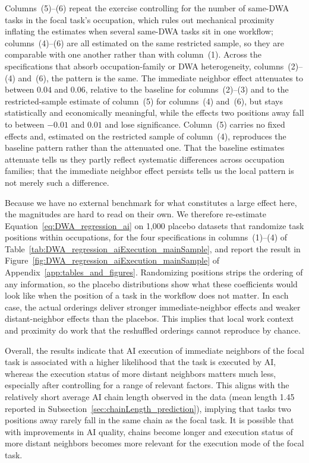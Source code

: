 Columns~(5)--(6) repeat the exercise controlling for the number of same-DWA tasks in the focal task's occupation, which rules out mechanical proximity inflating the estimates when several same-DWA tasks sit in one workflow; columns~(4)--(6) are all estimated on the same restricted sample, so they are comparable with one another rather than with column~(1).
Across the specifications that absorb occupation-family or DWA heterogeneity, columns~(2)--(4) and~(6), the pattern is the same.
The immediate neighbor effect attenuates to between $0.04$ and $0.06$, relative to the baseline for columns~(2)--(3) and to the restricted-sample estimate of column~(5) for columns~(4) and~(6), but stays statistically and economically meaningful, while the effects two positions away fall to between $-0.01$ and $0.01$ and lose significance.
Column~(5) carries no fixed effects and, estimated on the restricted sample of column~(4), reproduces the baseline pattern rather than the attenuated one.
That the baseline estimates attenuate tells us they partly reflect systematic differences across occupation families; that the immediate neighbor effect persists tells us the local pattern is not merely such a difference.

Because we have no external benchmark for what constitutes a large effect here, the magnitudes are hard to read on their own.
We therefore re-estimate Equation~\eqref{eq:DWA_regression_ai} on 1,000 placebo datasets that randomize task positions within occupations, for the four specifications in columns~(1)--(4) of Table~\ref{tab:DWA_regression_aiExecution_mainSample}, and report the result in Figure~\ref{fig:DWA_regression_aiExecution_mainSample} of Appendix~\ref{app:tables_and_figures}.
Randomizing positions strips the ordering of any information, so the placebo distributions show what these coefficients would look like when the position of a task in the workflow does not matter.
In each case, the actual orderings deliver stronger immediate-neighbor effects and weaker distant-neighbor effects than the placebos.
This implies that local work context and proximity do work that the reshuffled orderings cannot reproduce by chance.

Overall, the results indicate that AI execution of immediate neighbors of the focal task is associated with a higher likelihood that the task is executed by AI, whereas the execution status of more distant neighbors matters much less, especially after controlling for a range of relevant factors.
This aligns with the relatively short average AI chain length observed in the data (mean length 1.45 reported in Subsection~\ref{sec:chainLength_prediction}), implying that tasks two positions away rarely fall in the same chain as the focal task.
It is possible that with improvements in AI quality, chains become longer and execution status of more distant neighbors becomes more relevant for the execution mode of the focal task.


